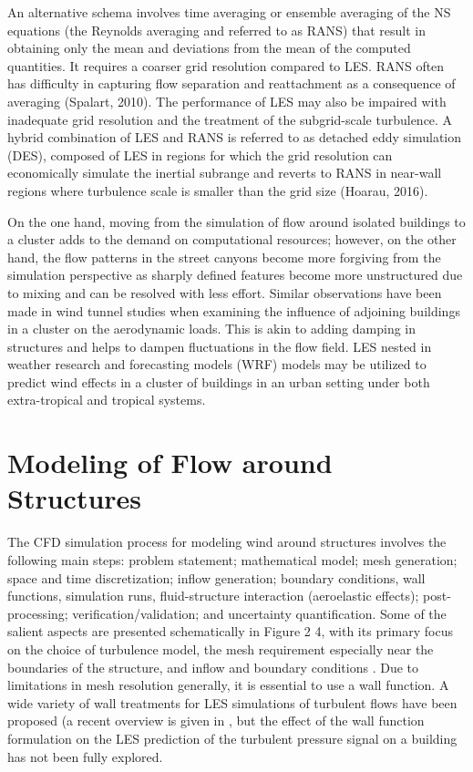 An alternative schema involves time averaging or ensemble averaging of the NS equations (the Reynolds averaging and referred to as RANS) that result in obtaining only the mean and deviations from the mean of the computed quantities. It requires a coarser grid resolution compared to LES. RANS often has difficulty in capturing flow separation and reattachment as a consequence of averaging (Spalart, 2010). The performance of LES may also be impaired with inadequate grid resolution and the treatment of the subgrid-scale turbulence. A hybrid combination of LES and RANS is referred to as detached eddy simulation (DES), composed of LES in regions for which the grid resolution can economically simulate the inertial subrange and reverts to RANS in near-wall regions where turbulence scale is smaller than the grid size (Hoarau, 2016).

On the one hand, moving from the simulation of flow around isolated buildings to a cluster adds to the demand on computational resources; however, on the other hand, the flow patterns in the street canyons become more forgiving from the simulation perspective as sharply defined features become more unstructured due to mixing and can be resolved with less effort. Similar observations have been made in wind tunnel studies when examining the influence of adjoining buildings in a cluster on the aerodynamic loads. This is akin to adding damping in structures and helps to dampen fluctuations in the flow field. LES nested in weather research and forecasting models (WRF) models may be utilized to predict wind effects in a cluster of buildings in an urban setting under both extra-tropical and tropical systems. 

\section{Modeling of Flow around Structures}
\label{sec:resp_cfd_wind_flow_modeling}

The CFD simulation process for modeling wind around structures involves the following main steps: problem statement; mathematical model; mesh generation; space and time discretization; inflow generation; boundary conditions, wall functions, simulation runs, fluid-structure interaction (aeroelastic effects); post-processing; verification/validation; and uncertainty quantification. Some of the salient aspects are presented schematically in Figure 2 4, with its primary focus on the choice of turbulence model, the mesh requirement especially near the boundaries of the structure, and inflow and boundary conditions \citep{ferziger2012computational}. Due to limitations in mesh resolution generally, it is essential to use a wall function. A wide variety of wall treatments for LES simulations of turbulent flows have been proposed (a recent overview is given in \citep{bose2018wall}, but the effect of the wall function formulation on the LES prediction of the turbulent pressure signal on a building has not been fully explored. 


